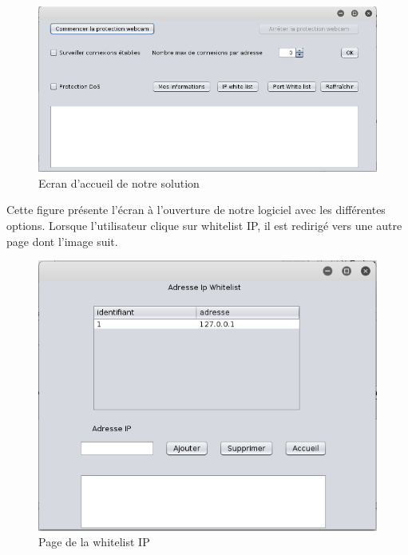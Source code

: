 				\paragraph{}
				\begin{figure}[H]
					\begin{center}
					    \includegraphics[scale=0.5]{images/accueil.png}
					\end{center}
					\caption{Ecran d'accueil de notre solution}
					\label{Accueil}
				    \end{figure}
				    Cette figure présente l'écran à l'ouverture de notre logiciel avec les différentes options. Lorsque l'utilisateur clique sur whitelist IP, il est redirigé vers une autre page dont l'image suit.
				     \begin{figure}[H]
					\begin{center}
					    \includegraphics[scale=0.5]{images/ipwhitelist.png}
					\end{center}
					\caption{Page de la whitelist IP}
					\label{Page de la whitelist IP}
				    \end{figure}
